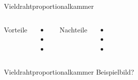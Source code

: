 \begin{frame}{Vieldrahtproportionalkammer}
    \begin{columns}[T]
			Vorteile		
			\begin{itemize}
			  \item 
			  \item
			  \item 
			\end{itemize}	
	    	Nachteile
	    	\begin{itemize}
			  \item 
			  \item 
			  \item 
			\end{itemize}
    \end{columns}
    \vspace{1cm}
\end{frame}


\begin{frame}{Vieldrahtproportionalkammer}
    Beispielbild?
\end{frame}
